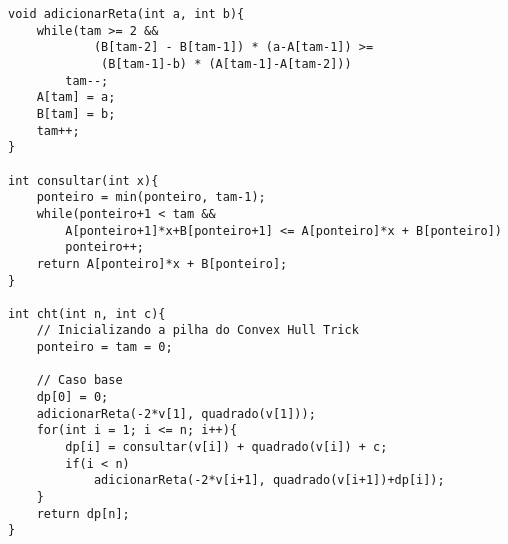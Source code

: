 \begin{itemize}[leftmargin=-.001in]
\begin{lstlisting}[caption={Implementação Convex Hull Trick 1 em C++},label={lst:cht}]
void adicionarReta(int a, int b){
	while(tam >= 2 && 
			(B[tam-2] - B[tam-1]) * (a-A[tam-1]) >=
			 (B[tam-1]-b) * (A[tam-1]-A[tam-2]))
		tam--;
	A[tam] = a;
	B[tam] = b;
	tam++;
}

int consultar(int x){
	ponteiro = min(ponteiro, tam-1);
	while(ponteiro+1 < tam && 
		A[ponteiro+1]*x+B[ponteiro+1] <= A[ponteiro]*x + B[ponteiro])
		ponteiro++;
	return A[ponteiro]*x + B[ponteiro];
}

int cht(int n, int c){
	// Inicializando a pilha do Convex Hull Trick
	ponteiro = tam = 0;
	
	// Caso base
	dp[0] = 0;
	adicionarReta(-2*v[1], quadrado(v[1]));
	for(int i = 1; i <= n; i++){
		dp[i] = consultar(v[i]) + quadrado(v[i]) + c;
		if(i < n)
			adicionarReta(-2*v[i+1], quadrado(v[i+1])+dp[i]);
	}
	return dp[n];
}


\end{lstlisting}
\end{itemize}

